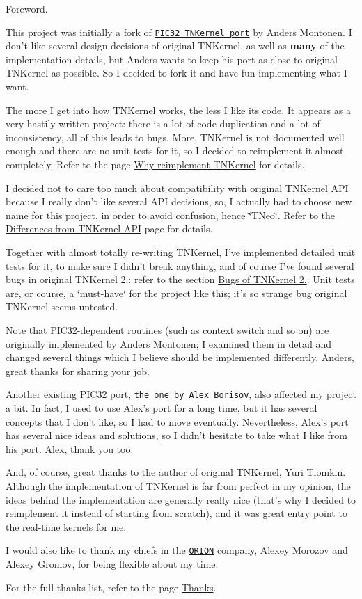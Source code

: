 Foreword.

This project was initially a fork of \href{https://github.com/andersm/TNKernel-PIC32}{\tt P\+I\+C32 T\+N\+Kernel port} by Anders Montonen. I don't like several design decisions of original T\+N\+Kernel, as well as {\bfseries many} of the implementation details, but Anders wants to keep his port as close to original T\+N\+Kernel as possible. So I decided to fork it and have fun implementing what I want.

The more I get into how T\+N\+Kernel works, the less I like its code. It appears as a very hastily-\/written project\+: there is a lot of code duplication and a lot of inconsistency, all of this leads to bugs. More, T\+N\+Kernel is not documented well enough and there are no unit tests for it, so I decided to reimplement it almost completely. Refer to the page \hyperlink{why_reimplement}{Why reimplement T\+N\+Kernel} for details.

I decided not to care too much about compatibility with original T\+N\+Kernel A\+P\+I because I really don't like several A\+P\+I decisions, so, I actually had to choose new name for this project, in order to avoid confusion, hence \char`\"{}\+T\+Neo\char`\"{}. Refer to the \hyperlink{tnkernel_diff}{Differences from T\+N\+Kernel A\+P\+I} page for details.

Together with almost totally re-\/writing T\+N\+Kernel, I've implemented detailed \hyperlink{unit_tests}{unit tests} for it, to make sure I didn't break anything, and of course I've found several bugs in original T\+N\+Kernel 2.\+: refer to the section \hyperlink{why_reimplement_why_reimplement__bugs}{Bugs of T\+N\+Kernel 2.}. Unit tests are, or course, a \char`\"{}must-\/have\char`\"{} for the project like this; it's so strange bug original T\+N\+Kernel seems untested.

Note that P\+I\+C32-\/dependent routines (such as context switch and so on) are originally implemented by Anders Montonen; I examined them in detail and changed several things which I believe should be implemented differently. Anders, great thanks for sharing your job.

Another existing P\+I\+C32 port, \href{http://www.tnkernel.com/tn_port_pic24_dsPIC_PIC32.html}{\tt the one by Alex Borisov}, also affected my project a bit. In fact, I used to use Alex's port for a long time, but it has several concepts that I don't like, so I had to move eventually. Nevertheless, Alex's port has several nice ideas and solutions, so I didn't hesitate to take what I like from his port. Alex, thank you too.

And, of course, great thanks to the author of original T\+N\+Kernel, Yuri Tiomkin. Although the implementation of T\+N\+Kernel is far from perfect in my opinion, the ideas behind the implementation are generally really nice (that's why I decided to reimplement it instead of starting from scratch), and it was great entry point to the real-\/time kernels for me.

I would also like to thank my chiefs in the \href{http://orionspb.ru/}{\tt O\+R\+I\+O\+N} company, Alexey Morozov and Alexey Gromov, for being flexible about my time.

For the full thanks list, refer to the page \hyperlink{thanks}{Thanks}. 